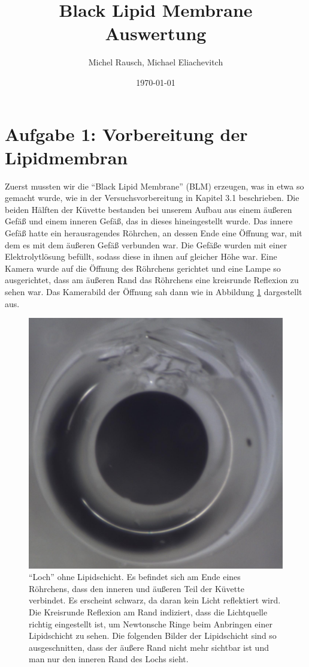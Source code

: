 \documentclass[a4paper,ngerman]{scrartcl}
\title{Black Lipid Membrane\\ Auswertung}
\date{\today}
\author{Michel Rausch, Michael Eliachevitch}
\begin{document}
\maketitle
\tableofcontents
\newpage

\section{Aufgabe 1: Vorbereitung der Lipidmembran}
Zuerst mussten wir die "`Black Lipid Membrane"' (BLM) erzeugen, was in etwa so gemacht wurde, wie in der Versuchsvorbereitung in Kapitel 3.1 beschrieben.
Die beiden Hälften der Küvette bestanden bei unserem Aufbau aus einem äußeren Gefäß und einem inneren Gefäß, das in dieses hineingestellt wurde.
Das innere Gefäß hatte ein herausragendes Röhrchen, an dessen Ende eine Öffnung war, mit dem es mit dem äußeren Gefäß verbunden war.
Die Gefäße wurden mit einer Elektrolytlösung befüllt, sodass diese in ihnen auf gleicher Höhe war. Eine Kamera wurde auf die Öffnung des Röhrchens
gerichtet und eine Lampe so ausgerichtet, dass am äußeren Rand das Röhrchens eine kreisrunde Reflexion zu sehen war. Das Kamerabild der Öffnung sah dann wie in Abbildung \ref{fig:loch} dargestellt aus. 

\begin{figure}[tbh!]
  \centering
  \includegraphics[width=.4\textwidth]{abbildungen/ohnelipidschicht_cut.jpg}
  \caption{"`Loch"' ohne Lipidschicht. Es befindet sich am Ende eines Röhrchens, dass den inneren und äußeren Teil der Küvette verbindet.
Es erscheint schwarz, da daran kein Licht reflektiert wird.\\
Die Kreisrunde Reflexion am Rand indiziert, dass die Lichtquelle richtig eingestellt ist, um Newtonsche Ringe beim Anbringen einer
Lipidschicht zu sehen. Die folgenden Bilder der Lipidschicht sind so ausgeschnitten, dass der äußere Rand nicht mehr sichtbar ist und man nur den inneren Rand des Lochs sieht.}
  \label{fig:loch}
\end{figure}
\end{document}
